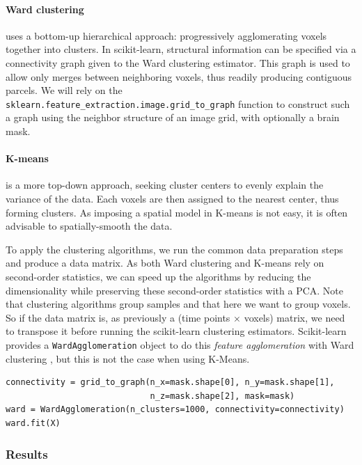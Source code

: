 \documentclass{frontiersSCNS} %
\begin{document}
\paragraph{Ward clustering} uses a bottom-up hierarchical approach:
progressively agglomerating voxels together into clusters. In
scikit-learn, structural information can be specified via a connectivity
graph given to the Ward clustering estimator. This graph is used to allow
only merges between neighboring voxels, thus readily producing contiguous
parcels. We will rely on the {\tt
sklearn.feature\_extraction.image.grid\_to\_graph} function to
construct such a graph using the neighbor structure of an image grid,
with optionally a brain mask.

\paragraph{K-means} is a more top-down approach, seeking cluster centers
to evenly explain the variance of the data. Each voxels are then assigned
to the nearest center, thus forming clusters. As imposing a spatial model
in K-means is not easy, it is often advisable to spatially-smooth the
data.

To apply the clustering algorithms, we run the common data preparation
steps and produce a data matrix. As both Ward clustering and K-means rely
on second-order statistics, we can speed up the algorithms by reducing
the dimensionality while preserving these second-order statistics with a
PCA. Note that clustering algorithms group samples and that here we want
to group voxels. So if the data matrix is, as previously a (time points
$\times$ voxels) matrix, we need to transpose it before running the
scikit-learn clustering estimators. Scikit-learn provides a
\texttt{WardAgglomeration} object to do this \emph{feature agglomeration}
with Ward clustering \cite{michel2012supervisedclustering}, but this is
not the case when using K-Means.

\begin{lstlisting}
connectivity = grid_to_graph(n_x=mask.shape[0], n_y=mask.shape[1],
                             n_z=mask.shape[2], mask=mask)
ward = WardAgglomeration(n_clusters=1000, connectivity=connectivity)
ward.fit(X)
\end{lstlisting}

\subsubsection{Results}
\end{document}

